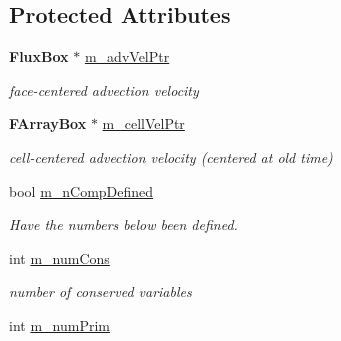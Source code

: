 \subsection*{Protected Attributes}
\begin{DoxyCompactItemize}
\item 
\mbox{\label{class_advection_physics_a2190804e60d76f635a4038cd73181f36}} 
\textbf{ Flux\+Box} $\ast$ \hyperlink{class_advection_physics_a2190804e60d76f635a4038cd73181f36}{m\+\_\+adv\+Vel\+Ptr}
\begin{DoxyCompactList}\small\item\em face-\/centered advection velocity \end{DoxyCompactList}\item 
\mbox{\label{class_advection_physics_aba4173a2c90618f66566560d07de35d4}} 
\textbf{ F\+Array\+Box} $\ast$ \hyperlink{class_advection_physics_aba4173a2c90618f66566560d07de35d4}{m\+\_\+cell\+Vel\+Ptr}
\begin{DoxyCompactList}\small\item\em cell-\/centered advection velocity (centered at old time) \end{DoxyCompactList}\item 
\mbox{\label{class_advection_physics_a10c269a32c67b6651665ca09f9005af7}} 
bool \hyperlink{class_advection_physics_a10c269a32c67b6651665ca09f9005af7}{m\+\_\+n\+Comp\+Defined}
\begin{DoxyCompactList}\small\item\em Have the numbers below been defined. \end{DoxyCompactList}\item 
\mbox{\label{class_advection_physics_ac71f679ddec1513ac5f600840592a63b}} 
int \hyperlink{class_advection_physics_ac71f679ddec1513ac5f600840592a63b}{m\+\_\+num\+Cons}
\begin{DoxyCompactList}\small\item\em number of conserved variables \end{DoxyCompactList}\item 
\mbox{\label{class_advection_physics_aba83ecb3c338828921f17cba7faa2dc6}} 
int \hyperlink{class_advection_physics_aba83ecb3c338828921f17cba7faa2dc6}{m\+\_\+num\+Prim}

\end{DoxyCompactItemize}
